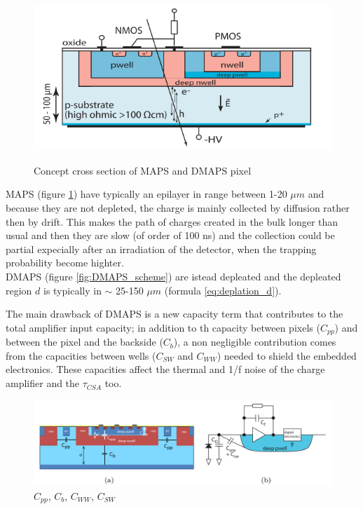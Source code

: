 \begin{titlepage}
\begin{figure}
\begin{minipage}{0.48\textwidth}
     \label{fig:MAPS_scheme}
   \end{minipage}
   \begin{minipage}{0.48\textwidth}
     \centering
     \includegraphics[width=1.\linewidth]{figures/DMAPS_scheme.png}
     \label{fig:DMAPS_scheme}
   \end{minipage}
   \caption{Concept cross section of MAPS and DMAPS pixel}
   \label{fig:MAPS_DMAPS_scheme}
\end{figure}
MAPS (figure \ref{fig:MAPS_DMAPS_scheme}) have typically an epilayer in range between 
1-20 $\mu m$ and because they
are not depleted, the charge is mainly collected by diffusion rather then by drift.
This makes the path of charges created in the bulk longer than usual and then they are
slow (of order of 100 ns) and the collection could be partial expecially after
an irradiation of the detector, when the trapping probability become highter. \\
DMAPS (figure \ref{fig:DMAPS_scheme}) are istead depleated and the depleated region
$d$ is typically in $\sim$ 25-150 $\mu m$ (formula \ref{eq:deplation_d}).

The main drawback of DMAPS is a new capacity term that contributes to the total
amplifier input capacity; in addition to th capacity between pixels ($C_{pp}$) and
between the pixel and the backside ($C_{b}$), a non negligible contribution comes
from the capacities between wells ($C_{SW}$ and $C_{WW}$) needed to shield the
embedded electronics. These capacities affect the thermal and 1/f noise of the charge amplifier and
the $ \tau_{CSA}$ too. 
\begin{figure}[h!]
\centering\includegraphics[width=12cm]{figures/DMAPS_capacity.png}
\caption{$C_{pp}$, $C_{b}$, $C_{WW}$, $C_{SW}$}
\label{fig:DMAPS_capacity}
\end{figure}


\end{titlepage}
